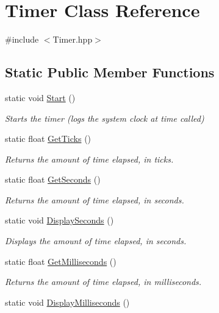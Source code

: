 \hypertarget{classTimer}{}\section{Timer Class Reference}
\label{classTimer}


{\ttfamily \#include $<$Timer.\+hpp$>$}

\subsection*{Static Public Member Functions}
\begin{DoxyCompactItemize}
\item 
static void \hyperlink{classTimer_a4e607b129b392c11adddd9641a320436}{Start} ()
\begin{DoxyCompactList}\small\item\em Starts the timer (logs the system clock at time called) \end{DoxyCompactList}\item 
static float \hyperlink{classTimer_ae86a26d075c154ca068fb1da5e44f4ad}{Get\+Ticks} ()
\begin{DoxyCompactList}\small\item\em Returns the amount of time elapsed, in ticks. \end{DoxyCompactList}\item 
static float \hyperlink{classTimer_a4822f3d31f7aa331b1197c56a321eebe}{Get\+Seconds} ()
\begin{DoxyCompactList}\small\item\em Returns the amount of time elapsed, in seconds. \end{DoxyCompactList}\item 
static void \hyperlink{classTimer_a207f24813c54b787ae4de5d109d304ae}{Display\+Seconds} ()
\begin{DoxyCompactList}\small\item\em Displays the amount of time elapsed, in seconds. \end{DoxyCompactList}\item 
static float \hyperlink{classTimer_aa97a596bebfa5b8c0d7491066ae3f931}{Get\+Milliseconds} ()
\begin{DoxyCompactList}\small\item\em Returns the amount of time elapsed, in milliseconds. \end{DoxyCompactList}\item 
static void \hyperlink{classTimer_a937acc867bb310cc69dfac532bcd0151}{Display\+Milliseconds} ()

\end{DoxyCompactItemize}
